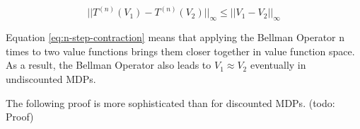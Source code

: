 \begin{equation}
||T^{(n)}(V_1)-T^{(n)}(V_2)||_\infty \leq ||V_1-V_2||_\infty
\label{eq:n-step-contraction}
\end{equation}

Equation \ref{eq:n-step-contraction} means that applying the Bellman Operator n times to two value functions brings them closer together in value function space. As a result, the Bellman Operator also leads to $V_1 \approx V_2$ eventually in undiscounted MDPs.

The following proof is more sophisticated than for discounted MDPs. 
(todo: Proof)

